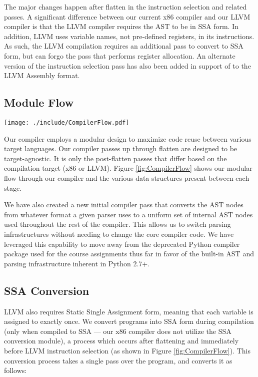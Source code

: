 \documentclass[11pt,twocolumn]{article}
\begin{document}
The major changes happen after flatten in the instruction selection
and related passes. A significant difference between our current x86
compiler and our LLVM compiler is that the LLVM compiler requires the
AST to be in SSA form. In addition, LLVM uses variable names, not
pre-defined registers, in its instructions. As such, the LLVM
compilation requires an additional pass to convert to SSA form, but
can forgo the pass that performs register allocation.  An alternate
version of the instruction selection pass has also been added in
support of to the LLVM Assembly format.

\subsection{Module Flow}

\begin{figure*}[htb]
   \centering
   \texttt{[image: ./include/CompilerFlow.pdf]}
   \caption{Compiler Data Flow}
   \label{fig:CompilerFlow}
\end{figure*}

Our compiler employs a modular design to maximize code reuse between
various target languages.  Our compiler passes up through flatten are
designed to be target-agnostic. It is only the post-flatten passes
that differ based on the compilation target (x86 or LLVM). Figure
\ref{fig:CompilerFlow} shows our modular flow through our compiler and
the various data structures present between each stage.

We have also created a new initial compiler pass that converts the AST
nodes from whatever format a given parser uses to a uniform set of
internal AST nodes used throughout the rest of the compiler. This
allows us to switch parsing infrastructures without needing to change
the core compiler code. We have leveraged this capability to move away
from the deprecated Python compiler package used for the course
assignments thus far in favor of the built-in AST and parsing
infrastructure inherent in Python 2.7+.

\subsection{SSA Conversion}

LLVM also requires Static Single Assignment form, meaning that each
variable is assigned to exactly once.  We convert programs into SSA
form during compilation (only when compiled to SSA --- our x86
compiler does not utilize the SSA conversion module), a process which
occurs after flattening and immediately before LLVM instruction
selection (as shown in Figure \ref{fig:CompilerFlow}).  This
conversion process takes a single pass over the program, and converts
it as follows:
\end{document}
